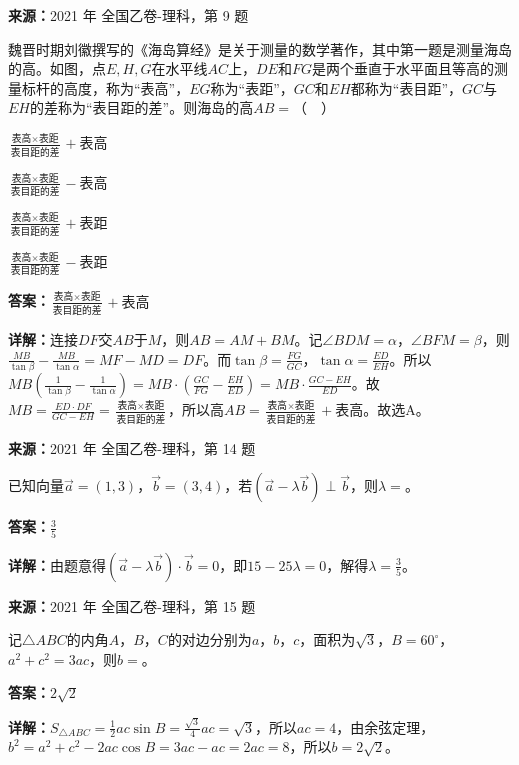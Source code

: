 \begin{question}[points=5]
\textbf{来源：}2021 年 全国乙卷-理科，第 9 题\par
魏晋时期刘徽撰写的《海岛算经》是关于测量的数学著作，其中第一题是测量海岛的高。如图，点$E,H,G$在水平线$AC$上，$DE$和$FG$是两个垂直于水平面且等高的测量标杆的高度，称为“表高”，$EG$称为“表距”，$GC$和$EH$都称为“表目距”，$GC$与$EH$的差称为“表目距的差”。则海岛的高$AB=$（  ）
\begin{choices}
  \item $\frac{\text{表高}\times\text{表距}}{\text{表目距的差}}+\text{表高}$
  \item $\frac{\text{表高}\times\text{表距}}{\text{表目距的差}}-\text{表高}$
  \item $\frac{\text{表高}\times\text{表距}}{\text{表目距的差}}+\text{表距}$
  \item $\frac{\text{表高}\times\text{表距}}{\text{表目距的差}}-\text{表距}$
\end{choices}
\begin{solution}
\textbf{答案：}$\frac{\text{表高}\times\text{表距}}{\text{表目距的差}}+\text{表高}$

\textbf{详解：}连接$DF$交$AB$于$M$，则$AB=AM+BM$。记$\angle BDM=\alpha$，$\angle BFM=\beta$，则$\frac{MB}{\tan\beta}-\frac{MB}{\tan\alpha}=MF-MD=DF$。而$\tan\beta=\frac{FG}{GC}$，$\tan\alpha=\frac{ED}{EH}$。所以$MB\left(\frac{1}{\tan\beta}-\frac{1}{\tan\alpha}\right)=MB\cdot\left(\frac{GC}{FG}-\frac{EH}{ED}\right)=MB\cdot\frac{GC-EH}{ED}$。故$MB=\frac{ED\cdot DF}{GC-EH}=\frac{\text{表高}\times\text{表距}}{\text{表目距的差}}$，所以高$AB=\frac{\text{表高}\times\text{表距}}{\text{表目距的差}}+\text{表高}$。故选A。
\end{solution}
\end{question}

\begin{question}[points=5]
\textbf{来源：}2021 年 全国乙卷-理科，第 14 题\par
已知向量$\vec{a}=(1,3)$，$\vec{b}=(3,4)$，若$(\vec{a}-\lambda\vec{b})\perp\vec{b}$，则$\lambda=$。
\fillin[{$\frac{3}{5}$}]
\begin{solution}
\textbf{答案：}$\frac{3}{5}$

\textbf{详解：}由题意得$(\vec{a}-\lambda\vec{b})\cdot\vec{b}=0$，即$15-25\lambda=0$，解得$\lambda=\frac{3}{5}$。
\end{solution}
\end{question}

\begin{question}[points=5]
\textbf{来源：}2021 年 全国乙卷-理科，第 15 题\par
记$\triangle ABC$的内角$A$，$B$，$C$的对边分别为$a$，$b$，$c$，面积为$\sqrt{3}$，$B=60^\circ$，$a^2+c^2=3ac$，则$b=$。
\fillin[{$2\sqrt{2}$}]
\begin{solution}
\textbf{答案：}$2\sqrt{2}$

\textbf{详解：}$S_{\triangle ABC}=\frac12ac\sin B=\frac{\sqrt{3}}{4}ac=\sqrt{3}$，所以$ac=4$，由余弦定理，$b^2=a^2+c^2-2ac\cos B=3ac-ac=2ac=8$，所以$b=2\sqrt{2}$。
\end{solution}
\end{question}

